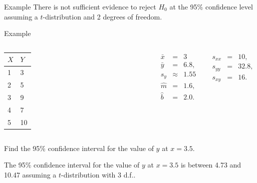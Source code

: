 \begin{frame}{Example}
      {
        There is {\color{red}not} sufficient evidence to reject $H_0$
        at the 95\% confidence level assuming a $t$-distribution and 2
        degrees of freedom.
      }


\end{frame}


\begin{frame}{Example}


    \begin{columns}

      \begin{tabular}{l|l}
        $X$ & $Y$ \\ \hline
        1 & 3 \\
        2 & 5  \\
        3 & 9 \\
        4 & 7  \\
        5 & 10
      \end{tabular}


      \begin{eqnarray*}
        \bar{x} & = & 3 \\
        \bar{y} & = & 6.8, \\
        s_y & \approx & 1.55 \\
        \hat{m} & = & 1.6, \\
        \hat{b} & = & 2.0.
      \end{eqnarray*}


      \begin{eqnarray*}
        s_{xx} & = & 10, \\
        s_{yy} & = & 32.8, \\
        s_{xy} & = & 16.
      \end{eqnarray*}

    \end{columns}


    \vfill 


      Find the 95\% confidence interval for the value of $y$ at $x=3.5$.

      {

        The 95\% confidence interval for the value of $y$ at $x=3.5$
        is between 4.73 and 10.47 assuming a $t$-distribution with 3 d.f..
      }


\end{frame}


